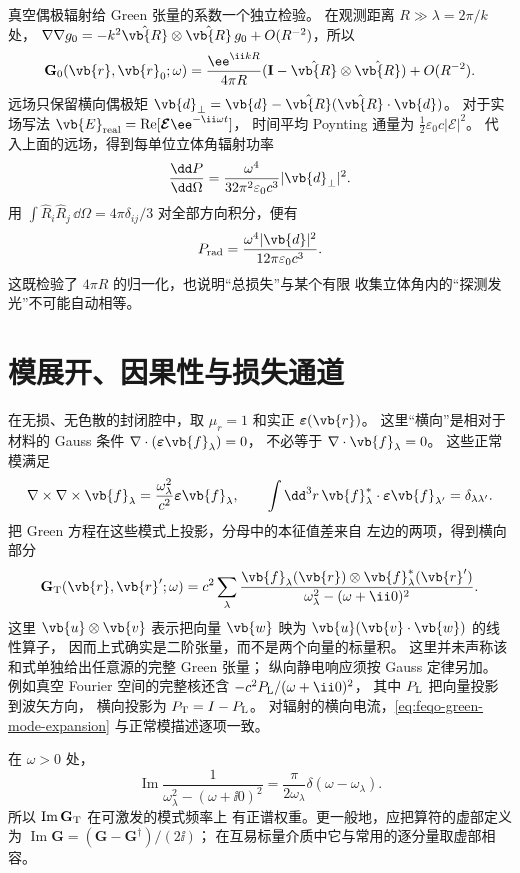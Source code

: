 真空偶极辐射给 Green 张量的系数一个独立检验。
在观测距离 \(R\gg\lambda=2\pi/k\) 处，
\(\nabla\nabla g_0=-k^2\hat{\vb{R}}\otimes
\hat{\vb{R}}\,g_0+O(R^{-2})\)，所以
\[
\mathbf G_0(\vb{r},\vb{r}_0;\omega)
=\frac{\ee^{\ii kR}}{4\pi R}
(\mathbf I-\hat{\vb{R}}\otimes\hat{\vb{R}})
+O(R^{-2}).
\]
远场只保留横向偶极矩
\(\vb{d}_\perp=\vb{d}-
\hat{\vb{R}}(\hat{\vb{R}}\cdot\vb{d})\)。
对于实场写法
\(\vb{E}_{\rm real}=\operatorname{Re}[
\boldsymbol{\mathcal E}\ee^{-\ii\omega t}]\)，
时间平均 Poynting 通量为
\(\frac12\varepsilon_0c|\boldsymbol{\mathcal E}|^2\)。
代入上面的远场，得到每单位立体角辐射功率
\[
\frac{\dd P}{\dd\Omega}
=\frac{\omega^4}{32\pi^2\varepsilon_0c^3}
|\vb{d}_\perp|^2.
\]
用 \(\int\hat R_i\hat R_j\,\dd\Omega
=4\pi\delta_{ij}/3\) 对全部方向积分，便有
\[
P_{\rm rad}
=\frac{\omega^4|\vb{d}|^2}{12\pi\varepsilon_0c^3}.
\]
这既检验了 \(4\pi R\) 的归一化，也说明“总损失”与某个有限
收集立体角内的“探测发光”不可能自动相等。

\section{模展开、因果性与损失通道}
\label{sec:feqo-green-spectral}

在无损、无色散的封闭腔中，取 \(\mu_r=1\) 和实正
\(\boldsymbol\varepsilon(\vb{r})\)。
这里“横向”是相对于材料的 Gauss 条件
\(\nabla\cdot(\boldsymbol\varepsilon\vb{f}_\lambda)=0\)，
不必等于 \(\nabla\cdot\vb{f}_\lambda=0\)。
这些正常模满足
\[
\nabla\times\nabla\times\vb{f}_\lambda
=\frac{\omega_\lambda^2}{c^2}
\boldsymbol\varepsilon\vb{f}_\lambda,\qquad
\int\dd^3r\,
\vb{f}_\lambda^*\cdot\boldsymbol\varepsilon\vb{f}_{\lambda'}
=\delta_{\lambda\lambda'}.
\]
把 Green 方程在这些模式上投影，分母中的本征值差来自
左边的两项，得到横向部分
\begin{equation}
\mathbf G_{\rm T}(\vb{r},\vb{r}';\omega)
=c^2\sum_\lambda
\frac{\vb{f}_\lambda(\vb{r})
\otimes\vb{f}_\lambda^*(\vb{r}')}
{\omega_\lambda^2-(\omega+\ii0)^2}.
\label{eq:feqo-green-mode-expansion}
\end{equation}
这里 \(\vb{u}\otimes\vb{v}\) 表示把向量 \(\vb{w}\)
映为 \(\vb{u}(\vb{v}\cdot\vb{w})\) 的线性算子，
因而上式确实是二阶张量，而不是两个向量的标量积。
这里并未声称该和式单独给出任意源的完整 Green 张量；
纵向静电响应须按 Gauss 定律另加。
例如真空 Fourier 空间的完整核还含
\(-c^2P_{\rm L}/(\omega+\ii0)^2\)，
其中 \(P_{\rm L}\) 把向量投影到波矢方向，
横向投影为 \(P_{\rm T}=I-P_{\rm L}\)。
对辐射的横向电流，\cref{eq:feqo-green-mode-expansion}
与正常模描述逐项一致。

在 \(\omega>0\) 处，
\[
\operatorname{Im}
\frac1{\omega_\lambda^2-(\omega+\ii0)^2}
=\frac{\pi}{2\omega_\lambda}\delta(\omega-\omega_\lambda).
\]
所以 \(\operatorname{Im}\mathbf G_{\rm T}\) 在可激发的模式频率上
有正谱权重。更一般地，应把算符的虚部定义为
\(\operatorname{Im}\mathbf G=(\mathbf G-\mathbf G^\dagger)/(2\ii)\)；
在互易标量介质中它与常用的逐分量取虚部相容。

